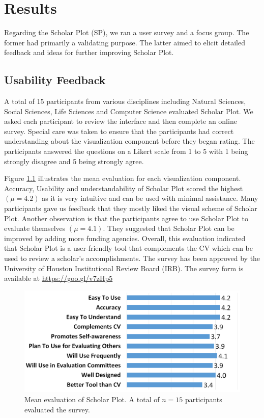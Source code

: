 \chapter{Results}\label{chap:Results}
Regarding the Scholar Plot (SP), we ran a user survey and a focus group. The former had primarily a validating purpose. The latter aimed to elicit detailed feedback and ideas for further improving Scholar Plot. 

\section{Usability Feedback}

A total of 15 participants from various disciplines including Natural Sciences, Social Sciences, Life Sciences and Computer Science evaluated Scholar Plot. We asked each participant to review the interface and then complete an online survey. Special care was taken to ensure that the participants had correct understanding about the visualization component before they began rating. The participants answered the questions on a Likert scale from 1 to 5 with 1 being strongly disagree and 5 being strongly agree.

Figure \ref{fig:UserStudy} illustrates the mean evaluation for each visualization component. Accuracy, Usability and understandability of Scholar Plot scored the highest $(\mu = 4.2)$ as it is very intuitive and can be used with minimal assistance. Many participants gave us feedback that they mostly liked the visual scheme of Scholar Plot. Another observation is that the participants agree to use Scholar Plot to evaluate themselves $(\mu = 4.1)$. They suggested that Scholar Plot can be improved by adding more funding agencies. Overall, this evaluation indicated that Scholar Plot is a user-friendly tool that complements the CV which can be used to review a scholar's accomplishments. The survey has been approved by the University of Houston Institutional Review Board (IRB). The survey form is available at \url{https://goo.gl/v7zHp5}
 
 \begin{figure}
  \centering
  \includegraphics[width=\columnwidth]{figures/fig_survey_chart}
  \caption{Mean evaluation of Scholar Plot. A total of $n=15$ participants evaluated the survey.}
  \label{fig:UserStudy} 
\end{figure}

